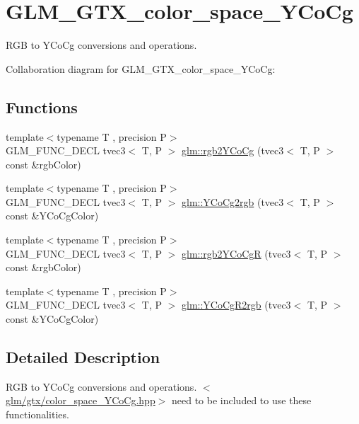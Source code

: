 \hypertarget{group__gtx__color__space___y_co_cg}{\section{G\-L\-M\-\_\-\-G\-T\-X\-\_\-color\-\_\-space\-\_\-\-Y\-Co\-Cg}
\label{group__gtx__color__space___y_co_cg}
}


R\-G\-B to Y\-Co\-Cg conversions and operations.  


Collaboration diagram for G\-L\-M\-\_\-\-G\-T\-X\-\_\-color\-\_\-space\-\_\-\-Y\-Co\-Cg\-:
\subsection*{Functions}
\begin{DoxyCompactItemize}
\item 
{\footnotesize template$<$typename T , precision P$>$ }\\G\-L\-M\-\_\-\-F\-U\-N\-C\-\_\-\-D\-E\-C\-L tvec3$<$ T, P $>$ \hyperlink{group__gtx__color__space___y_co_cg_ga19481f6947c5b5482debd41e71b8c941}{glm\-::rgb2\-Y\-Co\-Cg} (tvec3$<$ T, P $>$ const \&rgb\-Color)
\item 
{\footnotesize template$<$typename T , precision P$>$ }\\G\-L\-M\-\_\-\-F\-U\-N\-C\-\_\-\-D\-E\-C\-L tvec3$<$ T, P $>$ \hyperlink{group__gtx__color__space___y_co_cg_ga6d7e988a79b299ca1fa59f537e13800b}{glm\-::\-Y\-Co\-Cg2rgb} (tvec3$<$ T, P $>$ const \&Y\-Co\-Cg\-Color)
\item 
{\footnotesize template$<$typename T , precision P$>$ }\\G\-L\-M\-\_\-\-F\-U\-N\-C\-\_\-\-D\-E\-C\-L tvec3$<$ T, P $>$ \hyperlink{group__gtx__color__space___y_co_cg_ga2e534594cc8ad252d23b14fb363ae9e2}{glm\-::rgb2\-Y\-Co\-Cg\-R} (tvec3$<$ T, P $>$ const \&rgb\-Color)
\item 
{\footnotesize template$<$typename T , precision P$>$ }\\G\-L\-M\-\_\-\-F\-U\-N\-C\-\_\-\-D\-E\-C\-L tvec3$<$ T, P $>$ \hyperlink{group__gtx__color__space___y_co_cg_ga4bac5462c00df0ae89242ecdbbe5dbad}{glm\-::\-Y\-Co\-Cg\-R2rgb} (tvec3$<$ T, P $>$ const \&Y\-Co\-Cg\-Color)
\end{DoxyCompactItemize}


\subsection{Detailed Description}
R\-G\-B to Y\-Co\-Cg conversions and operations. $<$\hyperlink{color__space___y_co_cg_8hpp}{glm/gtx/color\-\_\-space\-\_\-\-Y\-Co\-Cg.\-hpp}$>$ need to be included to use these functionalities. 

